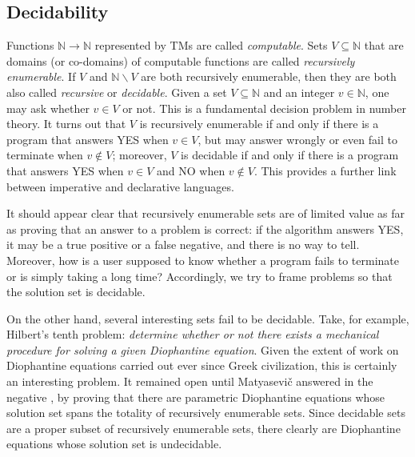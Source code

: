 \documentclass[a4paper]{book}
\theoremstyle{changebreak}                %
\begin{document}
\subsection{Decidability}
\label{s:computation:decidability}
Functions $\mathbb{N}\to\mathbb{N}$ represented by TMs are called {\it
  computable}. Sets
$V\subseteq\mathbb{N}$ that are domains (or
co-domains) of computable functions are called {\it
  recursively enumerable}. If $V$ and
$\mathbb{N}\smallsetminus V$ are both recursively enumerable, then
they are both also called {\it
  recursive} or {\it
  decidable}.  Given a set
$V\subseteq\mathbb{N}$ and an integer $v\in\mathbb{N}$, one may ask
whether $v\in V$ or not. This is a fundamental decision
problem in number theory. It
turns out that $V$ is recursively enumerable if and only if there is a
program that answers YES when $v\in V$, but may answer wrongly or even
fail to terminate when $v\not\in V$; moreover, $V$ is decidable if and
only if there is a program that answers YES when $v\in V$ and NO when
$v\not\in V$. This provides a further link between imperative and
declarative languages.

It should appear clear that recursively enumerable sets are of limited
value as far as proving that an answer to a problem is correct: if the
algorithm answers YES, it may be a true positive or a false negative,
and there is no way to tell. Moreover, how is a user supposed to know
whether a program fails to terminate or is
simply taking a long time?  Accordingly, we try to frame problems so
that the solution set is decidable.

On the other hand, several interesting sets fail to be decidable.
Take, for example, Hilbert's tenth problem: {\it
  determine whether or not there exists a mechanical procedure for
  solving a given Diophantine equation}.
Given the extent of work on Diophantine equations carried out ever
since Greek civilization, this is certainly an interesting problem.
It remained open until Matyasevi\v{c} answered
in the negative \cite{jones}, by proving that there are parametric
Diophantine equations whose solution set spans the totality of
recursively enumerable sets. Since
decidable sets are a proper subset of recursively
enumerable sets, there clearly are Diophantine equations whose
solution set is undecidable.
\end{document}
